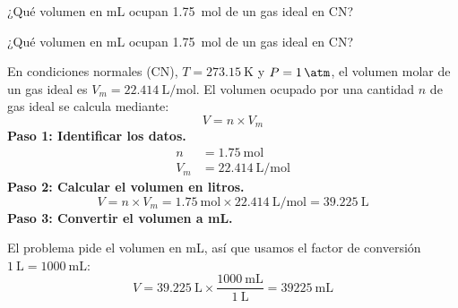 \begin{exercise}
    ¿Qué volumen en mL ocupan \qty{1.75}{\mol} de un gas ideal en CN?
    \begin{solu}
        ¿Qué volumen en mL ocupan \qty{1.75}{\mol} de un gas ideal en CN?


        En condiciones normales (CN), $T = \qty{273.15}{\kelvin}$ y $P = \qty{1}{\atm}$,
        el volumen molar de un gas ideal es $V_m = \qty{22.414}{\liter\per\mol}$. El volumen
        ocupado por una cantidad $n$ de gas ideal se calcula mediante:
        \begin{equation*}
            V = n \times V_m
        \end{equation*}
        \textbf{Paso 1: Identificar los datos.}
        \begin{align*}
            n   &= \qty{1.75}{\mol} \\
            V_m &= \qty{22.414}{\liter\per\mol}
        \end{align*}
        \textbf{Paso 2: Calcular el volumen en litros.}
        \begin{equation*}
            V = n \times V_m = \qty{1.75}{\mol} \times \qty{22.414}{\liter\per\mol}
            = \qty{39.225}{\liter}
        \end{equation*}
        \textbf{Paso 3: Convertir el volumen a mL.}

        El problema pide el volumen en mL, así que usamos el factor de conversión
        $\qty{1}{\liter} = \qty{1000}{\mL}$:
        \begin{equation*}
            V = \qty{39.225}{\liter} \times \frac{\qty{1000}{\mL}}{\qty{1}{\liter}}
            = \boxed{\qty{39225}{\mL}}
        \end{equation*}
    \end{solu}
\end{exercise}


